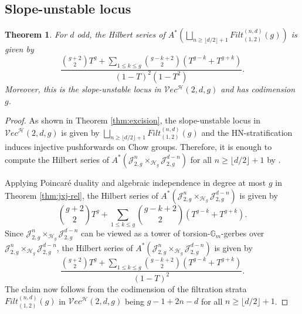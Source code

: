 \documentclass[11pt]{amsart}
\newtheorem{theorem}{Theorem}[section]
\theoremstyle{definition}
\newcommand{\J}{\mathscr{J}}
\newcommand{\jac}{\mathcal{J}}
\newcommand{\h}{\mathcal{H}}
\newcommand{\ve}{\mathcal{V}ec}
\newcommand{\gm}{\mathbb{G}_m}
\newcommand{\ext}{Filt}
\begin{document}
\subsection{Slope-unstable locus}
\begin{theorem}\label{thm:hilb-unstable}
    For $d$ odd, the Hilbert series of $A^*\left(\bigsqcup_{n\geq \lfloor d/2\rfloor+1}\ext^{(n,d)}_{(1,2)}(g) \right )$ is given by 
    $$\dfrac{{g+2\choose 2}T^g+\sum_{1\leq k\leq g}{g-k+2\choose 2}(T^{g-k}+T^{g+k})}{(1-T)^2(1-T^2)}.$$ Moreover, this is the slope-unstable locus in $\ve^\h(2,d,g)$ and has codimension $g$.
\end{theorem}
\begin{proof}
As shown in Theorem \ref{thm:excision}, the slope-unstable locus in $\ve^\h(2,d,g)$ is given by $\bigsqcup_{n\geq \lfloor d/2\rfloor+1}\ext^{(n,d)}_{(1,2)}(g)$
and the HN-stratification induces injective pushforwards on Chow groups. 
Therefore, it is enough to compute the Hilbert series of $A^*(\J^n_{2,g}\times_{\h_g}\J^{d-n}_{2,g})$ for all $n\geq \lfloor d/2\rfloor+1$ by \cite[Corollary 3.2]{prada}.    

Applying Poincar\'e duality and algebraic independence in degree at most $g$ in Theorem \ref{thm:jxj-rel}, 
the Hilbert series of $A^*(\jac^n_{2,g}\times_{\h_g}\jac^{d-n}_{2,g})$ is given by 
$${g+2\choose 2}T^g+\sum_{1\leq k\leq g}{g-k+2\choose 2}(T^{g-k}+T^{g+k}).$$
Since $\J^n_{2,g}\times_{\h_g}\J^{d-n}_{2,g}$ can be viewed as a tower of torsion-$\gm$-gerbes over $\jac^n_{2,g}\times_{\h_g}\jac^{d-n}_{2,g}$, the Hilbert series of $A^*(\J^n_{2,g}\times_{\h_g}\J^{d-n}_{2,g})$ is given by
    $$\dfrac{{g+2\choose 2}T^g+\sum_{1\leq k\leq g}{g-k+2\choose 2}(T^{g-k}+T^{g+k})}{(1-T)^2}.$$ 
The claim now follows from the codimension of the filtration strata $\ext^{(n,d)}_{(1,2)}(g)$ in $\ve^\h(2,d,g)$ 
being $g-1+2n-d$ for all $n\geq \lfloor d/2\rfloor+1$.
\end{proof}
\end{document}
